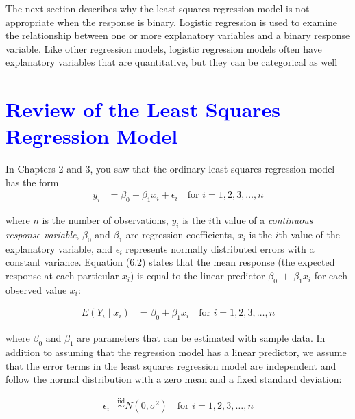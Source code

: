 \documentclass[
]{report}
\begin{document}
The next section describes why the least squares regression model is not appropriate when the response is binary. Logistic regression is used to examine the relationship between one or more explanatory variables and a binary response variable. Like other regression models, logistic regression models often have explanatory variables that are quantitative, but they can be categorical as well

\hypertarget{section-61}{%
\section{\texorpdfstring{\textcolor{blue}{ Review of the Least Squares Regression Model}}{}}\label{section-61}}

In Chapters 2 and 3, you saw that the ordinary least squares regression model has the form
\begin{align}
y_i &= \beta_0 + \beta_1 x_i + \epsilon_i
\quad\text{for } i = 1, 2, 3, \dots, n
\tag{6.1}
\end{align}

where \(\scriptstyle n\) is the number of observations, \(\scriptstyle y_i\) is the \(\scriptstyle i\)th value of a \textit{continuous response variable}, \(\scriptstyle \beta_0\) and \(\scriptstyle \beta_1\) are regression coefficients, \(\scriptstyle x_i\) is the \(\scriptstyle i\)th value of the explanatory variable, and \(\scriptstyle \epsilon_i\) represents normally distributed errors with a constant variance. Equation (6.2) states that the mean response (the expected response at each particular \(\scriptstyle x_i\)) is equal to the linear predictor \(\scriptstyle \beta_0 \ +\  \beta_1 x_i\) for each observed value \(\scriptstyle x_i\):

\begin{align}
E(Y_i \mid x_i) &= \beta_0 + \beta_1 x_i 
\quad\text{for } i = 1, 2, 3, \dots, n
\tag{6.2}
\end{align}

where \(\scriptstyle \beta_0\) and \(\scriptstyle \beta_1\) are parameters that can be estimated with sample data. In addition to assuming that the regression model has a linear predictor, we assume that the error terms in the least squares regression model are independent and follow the normal distribution with a zero mean and a fixed standard deviation:

\begin{align}
\epsilon_i &\overset{\mathrm{iid}}{\sim} N(0, \sigma^2) 
\quad\text{for } i = 1, 2, 3, \dots, n
\tag{6.3}
\end{align}
\end{document}
